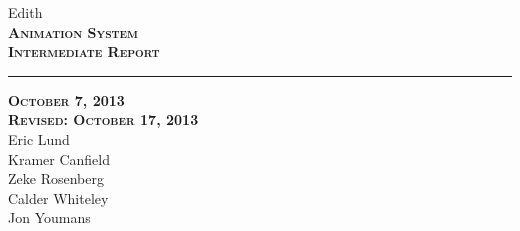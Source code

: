 \documentclass[12pt]{article}
\begin{document}
\begin{titlepage}
	\begin{center}
	\huge  Edith \\
	\vspace*{\fill}%
 	\huge \textsc{\textbf{Animation System \\Intermediate Report} }	
	\bigskip 
	\rule{130mm}{.1pt}
	\textsc{\textbf{October 7, 2013 \\ Revised: October 17, 2013} \\ }	
	\vspace*{\fill}%
	Eric Lund \\
	Kramer Canfield \\ 
	Zeke Rosenberg \\
	Calder Whiteley \\
	Jon Youmans
	\end{center}
\end{titlepage}

\end{document}
